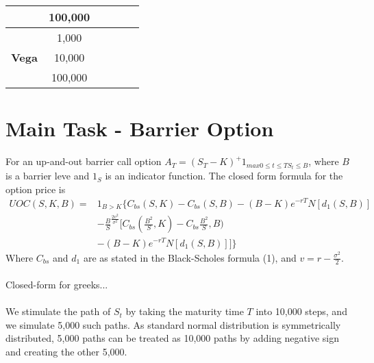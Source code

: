 \documentclass[12pt,a4paper,fleqn]{article}
\begin{document}
\begin{table}[]
\begin{tabular}{|c|c|c|c|c|c|}
                                                                                 & 100,000                    &                       &                       &                       &                       \\ \hline
\multirow{3}{*}{\textbf{Vega}}                                                   & 1,000                      & \multicolumn{1}{l|}{} & \multicolumn{1}{l|}{} & \multicolumn{1}{l|}{} & \multicolumn{1}{l|}{} \\ \cline{2-6} 
                                                                                 & 10,000                     & \multicolumn{1}{l|}{} & \multicolumn{1}{l|}{} & \multicolumn{1}{l|}{} & \multicolumn{1}{l|}{} \\ \cline{2-6} 
                                                                                 & 100,000                    &                       &                       &                       &                       \\ \hline
\end{tabular}
\end{table}



\section{Main Task - Barrier Option}

For an up-and-out barrier call option $A_T=(S_T-K)^+1_{max 0\leq t\leq T S_t\leq B}$, where $B$ is a barrier leve and $1_S$ is an indicator function. The closed form formula for the option price is
\begin{equation}
\begin{aligned}
UOC(S,K,B) ={} &1_{B>K}\{ C_{bs}(S, K)-C_{bs}(S,B)-(B-K)e^{-rT}N[d_{1}(S,B)] \\
      & -\frac{B}{S}^{\frac{2v^2}{\sigma^2}}[C_{bs}(\frac{B^2}{S}, K)-C_{bs}\frac{B^2}{S}, B) \\
      & -(B-K)e^{-rT}N[d_{1}(S,B)]]\}
\end{aligned}
\end{equation}
Where $C_{bs}$ and $d_{1}$ are as stated in the Black-Scholes formula (1), and $v=r-\frac{\sigma^2}{2}$. 
\\
\\
Closed-form for greeks...
\\
\\
We stimulate the path of $S_t$ by taking the maturity time $T$ into 10,000 steps, and we simulate 5,000 such paths. As standard normal distribution is symmetrically distributed, 5,000 paths can be treated as 10,000 paths by adding negative sign and creating the other 5,000.
\end{document}
